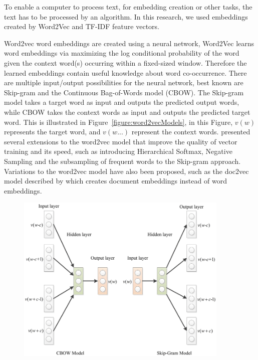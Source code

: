 \documentclass[../../Thesis.tex]{subfiles}
\begin{document}
To enable a computer to process text, for embedding creation or other tasks, the text has to be processed by an algorithm. In this research, we used embeddings created by Word2Vec and TF-IDF feature vectors.
\begin{jumpin}
Word2vec word embeddings are created using a neural network, Word2Vec learns word embeddings via maximizing the log conditional probability of the word given the context word(s) occurring within a fixed-sized window. Therefore the learned embeddings contain useful knowledge about word co-occurrence\cite{nalisnick2016improving}. There are multiple input/output possibilities for the neural network, best known are Skip-gram and the Continuous Bag-of-Words model (CBOW). The Skip-gram model takes a target word as input and outputs the predicted output words, while CBOW takes the context words as input and outputs the predicted target word\cite{nalisnick2016improving, pennington2014glove}. This is illustrated in Figure~\ref{figure:word2vecModels}, in this Figure, $v(w)$ represents the target word, and $v(w...)$ represent the context words. \citet{mikolov2013distributed}\cite{mikolov2013efficient} presented several extensions to the word2vec model that improve the quality of vector training and its speed, such as introducing Hierarchical Softmax, Negative Sampling and the subsampling of frequent words to the Skip-gram approach. Variations to the word2vec model have also been proposed, such as the doc2vec model described by \citet{lau2016empirical} which creates document embeddings instead of word embeddings.
\begin{center}
\begin{figure}[hbt]
\includegraphics[width=4in]{Plots/Model-Architecture-of-CBOW-and-Skip-Gram.png}

\end{figure}
\end{center}
\end{jumpin}
\end{document}
